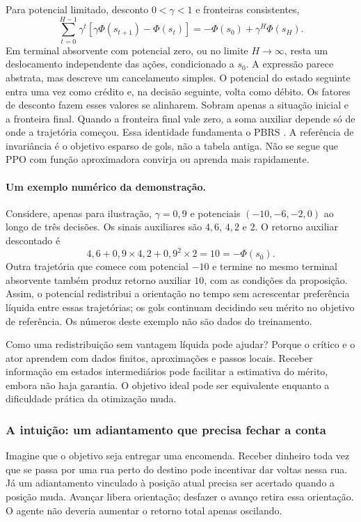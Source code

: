 \documentclass[11pt,a4paper]{article}
\begin{document}
Para potencial limitado, desconto $0<\gamma<1$ e fronteiras consistentes,
\begin{equation}
 \sum_{t=0}^{H-1}\gamma^t[\gamma\Phi(s_{t+1})-\Phi(s_t)]
 =-\Phi(s_0)+\gamma^H\Phi(s_H).
\end{equation}
Em terminal absorvente com potencial zero, ou no limite $H\to\infty$, resta um deslocamento independente das ações, condicionado a $s_0$.
A expressão parece abstrata, mas descreve um cancelamento simples. O potencial do estado seguinte entra uma vez como crédito e, na decisão seguinte, volta como débito. Os fatores de desconto fazem esses valores se alinharem. Sobram apenas a situação inicial e a fronteira final. Quando a fronteira final vale zero, a soma auxiliar depende só de onde a trajetória começou.
Essa identidade fundamenta o PBRS \cite{ng1999}. A referência de invariância é o objetivo esparso de gols, não a tabela antiga. Não se segue que PPO com função aproximadora convirja ou aprenda mais rapidamente.


\paragraph{Um exemplo numérico da demonstração.}
Considere, apenas para ilustração, $\gamma=0{,}9$ e potenciais $(-10,-6,-2,0)$ ao longo de três decisões. Os sinais auxiliares são $4{,}6$, $4{,}2$ e $2$. O retorno auxiliar descontado é
\begin{equation}
 4{,}6+0{,}9\times4{,}2+0{,}9^2\times2=10=-\Phi(s_0).
\end{equation}
Outra trajetória que comece com potencial $-10$ e termine no mesmo terminal absorvente também produz retorno auxiliar $10$, com as condições da proposição. Assim, o potencial redistribui a orientação no tempo sem acrescentar preferência líquida entre essas trajetórias; os gols continuam decidindo seu mérito no objetivo de referência. Os números deste exemplo não são dados do treinamento.

Como uma redistribuição sem vantagem líquida pode ajudar? Porque o crítico e o ator aprendem com dados finitos, aproximações e passos locais. Receber informação em estados intermediários pode facilitar a estimativa do mérito, embora não haja garantia. O objetivo ideal pode ser equivalente enquanto a dificuldade prática da otimização muda.


\subsubsection*{A intuição: um adiantamento que precisa fechar a conta}
Imagine que o objetivo seja entregar uma encomenda. Receber dinheiro toda vez que se passa por uma rua perto do destino pode incentivar dar voltas nessa rua. Já um adiantamento vinculado à posição atual precisa ser acertado quando a posição muda. Avançar libera orientação; desfazer o avanço retira essa orientação. O agente não deveria aumentar o retorno total apenas oscilando.
\end{document}
